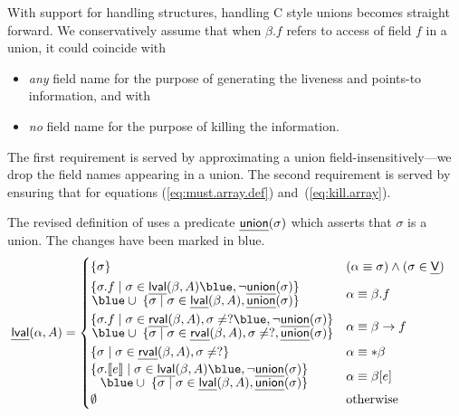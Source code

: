 \documentclass[a4paper,11pt,fleqn]{article}
\newcommand{\var}{\text{\sf\em V\/}\xspace}
\newcommand{\eval}[1]{\text{$\llbracket{#1}\rrbracket$}}
\newcommand{\app}{\text{\sf\em approx\/}\xspace}
\newcommand{\isunion}{\text{\sf\em union\/}}
\begin{document}
With support for handling structures, handling C style unions becomes straight forward.
We conservatively assume that when $\beta.f$ refers to access of field $f$ in
a union, it could coincide with 
\begin{itemize}
\item {\em any\/} field name for the purpose of generating the liveness and points-to information, and with
\item {\em no\/} field name for the purpose of killing the information.
\end{itemize}

The first requirement is served by approximating a union field-insensitively---we drop the field names
appearing in a union. 
The second requirement is served by ensuring that \text{$\isunion(\sigma) \Rightarrow \app(\sigma)$}
for equations (\ref{eq:must.array.def}) and~(\ref{eq:kill.array}).

The revised definition of \lval uses a
predicate $\isunion(\sigma)$ which asserts that $\sigma$ is a union. The 
changes have been marked in blue.
\begin{align}
\lval(\alpha,A) & =  
		\begin{cases}
		\{ \sigma \} 	
				& (\alpha \equiv \sigma) \wedge (\sigma \in \var)
			\\
		\renewcommand{\arraystretch}{.9}\begin{array}{@{}r@{}}
		\{ \sigma.f \mid \sigma \in \lval(\beta,A) {\blue, \neg\isunion(\sigma)} \} 
			\\
			\blue
			\cup\;
		\{ \sigma \mid \sigma \in \lval(\beta,A), \isunion(\sigma) \} 
		\end{array}
				& \alpha \equiv \beta.f 
				\rule[-1.25em]{0em}{3em}
			\\
		\renewcommand{\arraystretch}{.9}\begin{array}{@{}r@{}}
		\left\{ \sigma.f \mid \sigma \in \rval(\beta,A), \sigma \neq ? {\blue, \neg\isunion(\sigma)} \right\}
			\\
			\blue
			\cup\;
		\left\{ \sigma \mid \sigma \in \rval(\beta,A), \sigma \neq ?, \isunion(\sigma) \right\}
		\end{array}
				& \alpha \equiv \beta\rightarrow f
				\rule[-1.em]{0em}{2em}
			\\
		\left\{ \sigma \mid \sigma \in \rval(\beta,A), \sigma \neq ? \right\}
				& \alpha \equiv *\beta
			\\
		\renewcommand{\arraystretch}{.9}\begin{array}{@{}r@{}}
		\{ \sigma.\eval{e} \mid \sigma \in \lval(\beta,A) {\blue, \neg\isunion(\sigma)} \} 
			\\
			\blue
			\cup\;
		\{ \sigma \mid \sigma \in \lval(\beta,A), \isunion(\sigma) \} 
			\end{array}
				& 
				\alpha \equiv \beta[e]
				\rule[-.75em]{0em}{2.25em}
			\\
\emptyset	& \text{otherwise}
		\end{cases}
\end{align}
\end{document}
